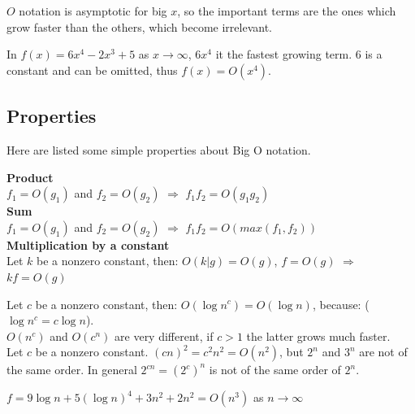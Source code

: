 \(O\) notation is asymptotic for big \(x\), so the important terms are the ones which grow faster than the others, which become irrelevant.

\begin{example}
In \(f(x) = 6x^{4} - 2x^{3} + 5\) as \(x \rightarrow \infty\), \(6x^{4}\) it the fastest growing term. \(6\) is a constant and can be omitted, thus \(f(x)=O(x^{4})\).  
\end{example}

\subsection{Properties}
Here are listed some simple properties about Big O notation.
\begin{definition}
\textbf{Product} \\
\(f_{1}=O(g_{1})\) and \(f_{2}=O(g_{2})\) \(\Rightarrow\) \(f_{1}f_{2}=O(g_{1}g_{2})\)
\\
\textbf{Sum} \\
\(f_{1}=O(g_{1})\) and \(f_{2}=O(g_{2})\) \(\Rightarrow\) \(f_{1}f_{2}=O(max(f_{1}, f_{2}))\)
\\
\textbf{Multiplication by a constant} \\
Let \(k\) be a nonzero constant, then: 
\(O(k|g)=O(g)\), \(f=O(g)\) \(\Rightarrow\)\(kf=O(g)\)
\end{definition}

\begin{definition}
Let \(c\) be a nonzero constant, then: \(O(\log n^{c}) = O(\log n)\), because: (\(\log n^{c} = c \log n\)).
\\
\(O(n^{c})\) and \(O(c^{n})\) are very different, if \(c>1\) the latter grows much faster.
\\
Let \(c\) be a nonzero constant. \((cn)^{2}=c^{2}n^{2} = O(n^{2})\), but \(2^{n}\) and \(3^{n}\) are not of the same order. In general \(2^{cn}=(2^{c})^{n}\) is not of the same order of \(2^{n}\).
\end{definition}

\begin{example}
\(f = 9 \log n + 5(\log n)^{4} + 3n^{2} + 2n^{2} = O(n^{3})\) as \(n \rightarrow \infty\)
\end{example}

